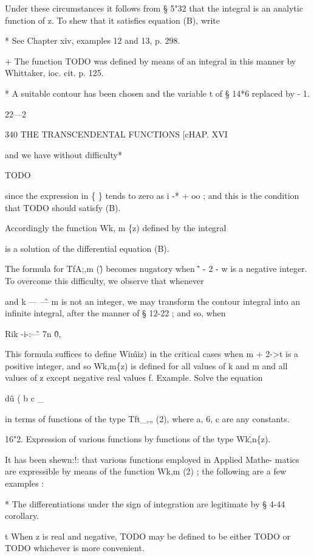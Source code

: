 Under these circumstances it follows from § 5"32 that the integral is an 
analytic function of z. To shew that it satisfies equation (B), write 



* See Chapter xiv, examples 12 and 13, p. 298. 

+ The function TODO was defined by means of an integral in this manner by Whittaker, 
ioc. cit. p. 125. 

* A suitable contour has been chosen and the variable t of § 14*6 replaced by - 1. 

22—2 



340 THE TRANSCENDENTAL FUNCTIONS [cHAP. XVI 

and we have without difficulty* 

TODO

since the expression in \{ \} tends to zero as i -* + oo ; and this is the condition 
that TODO should satisfy (B). 

Accordingly the function Wk, m \{z) defined by the integral 

is a solution of the differential equation (B). 

The formula for TfA;,m (\^) becomes nugatory when \^' - 2 - w is a negative 
integer. To overcome this difficulty, we observe that whenever 

and k — \^— m is not an integer, we may transform the contour integral into 
an infinite integral, after the manner of § 12-22 ; and so, when 

Rik -i-:\^— 7n \^0, 

This formula suffices to define Wi\^miz) in the critical cases when 
m + 2->t is a positive integer, and so Wk,m\{z) is defined for all values of 
k and m and all values of z except negative real values f. 
Example. Solve the equation 

d\^u ( b c \_ 

in terms of functions of the type Tft\_,„ (2), where a, 6, c are any constants. 

16"2. Expression of various functions by functions of the type Wk\^,n\{z). 

It has been shewn:!: that various functions employed in Applied Mathe- 
matics are expressible by means of the function Wk,m (2) ; the following are a 
few examples : 

* The differentiations under the sign of integration are legitimate by § 4-44 corollary. 

t When z is real and negative, TODO may be defined to be either TODO or 
TODO whichever is more convenient. 

